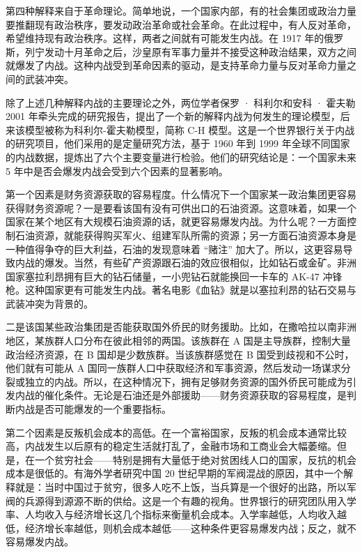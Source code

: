 第四种解释来自于革命理论。简单地说，一个国家内部，有的社会集团或政治力量要推翻现有政治秩序，要发动政治革命或社会革命。在此过程中，有人反对革命，希望维持现有政治秩序。这样，两者之间就有可能发生内战。在 1917 年的俄罗斯，列宁发动十月革命之后，沙皇原有军事力量并不接受这种政治结果，双方之间就爆发了内战。这种内战受到革命因素的驱动，是支持革命力量与反对革命力量之间的武装冲突。

除了上述几种解释内战的主要理论之外，两位学者保罗 · 科利尔和安科 · 霍夫勒 2001 年牵头完成的研究报告，提出了一个新的解释内战为何发生的理论模型，后来该模型被称为科利尔-霍夫勒模型，简称 C-H 模型。这是一个世界银行关于内战的研究项目，他们采用的是定量研究方法，基于 1960 年到 1999 年全球不同国家的内战数据，提炼出了六个主要变量进行检验。他们的研究结论是：一个国家未来 5 年中是否会爆发内战会受到六个因素的显著影响。

第一个因素是财务资源获取的容易程度。什么情况下一个国家某一政治集团更容易获得财务资源呢？一是要看该国有没有可供出口的石油资源。这意味着，如果一个国家在某个地区有大规模石油资源的话，就更容易爆发内战。为什么呢？一方面控制石油资源，就能获得购买军火、组建军队所需的资源；另一方面石油资源本身是一种值得争夺的巨大利益，石油的发现意味着 “赌注” 加大了。所以，这更容易导致内战的爆发。当然，有些矿产资源跟石油的效应很相似，比如钻石或金矿。非洲国家塞拉利昂拥有巨大的钻石储量，一小兜钻石就能换回一卡车的 AK-47 冲锋枪。这种国家更有可能发生内战。著名电影《血钻》就是以塞拉利昂的钻石交易与武装冲突为背景的。

二是该国某些政治集团是否能获取国外侨民的财务援助。比如，在撒哈拉以南非洲地区，某族群人口分布在彼此相邻的两国。该族群在 A 国是主导族群，控制大量政治经济资源，在 B 国却是少数族群。当该族群感觉在 B 国受到歧视和不公时，他们就有可能从 A 国同一族群人口中获取经济和军事资源，然后发动一场谋求分裂或独立的内战。所以，在这种情况下，拥有足够财务资源的国外侨民可能成为引发内战的催化条件。无论是石油还是外部援助——财务资源获取的容易程度，是判断内战是否可能爆发的一个重要指标。

第二个因素是反叛机会成本的高低。在一个富裕国家，反叛的机会成本通常比较高，内战发生以后原有的稳定生活就打乱了，金融市场和工商业会大幅萎缩。但是，在一个贫穷社会——特别是拥有大量低于绝对贫困线人口的国家，反抗的机会成本是很低的。有海外学者研究中国 20 世纪早期的军阀混战的原因，其中一个解释就是：当时中国过于贫穷，很多人吃不上饭，当兵算是一个很好的出路，所以军阀的兵源得到源源不断的供给。这是一个有趣的视角。世界银行的研究团队用入学率、人均收入与经济增长这几个指标来衡量机会成本。入学率越低，人均收入越低，经济增长率越低，则机会成本越低——这种条件更容易爆发内战；反之，就不容易爆发内战。

